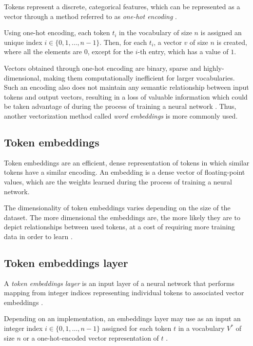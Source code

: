 Tokens represent a discrete, categorical features, which can be represented as a vector through a method referred to as \emph{one-hot encoding} \cite{hirst:neuralnetworkmethodsinnlp}.

Using one-hot encoding, each token $t_i$ in the vocabulary of size $n$ is assigned an unique index $i \in \{0, 1, \dots, n-1\}$. Then, for each $t_i$, a vector $v$ of size $n$ is created, where all the elements are $0$, except for the $i$-th entry, which has a value of $1$.

Vectors obtained through one-hot encoding are binary, sparse and highly-dimensional, making them computationally inefficient for larger vocabularies. Such an encoding also does not maintain any semantic relationship between input tokens and output vectors, resulting in a loss of valuable information which could be taken advantage of during the process of training a neural network \cite{tds:embeddings}. Thus, another vectorization method called \emph{word embeddings} is more commonly used.

\subsection{Token embeddings}
\label{embeddings}

Token embeddings are an efficient, dense representation of tokens in which similar tokens have a similar encoding. An embedding is a dense vector of floating-point values, which are the weights learned during the process of training a neural network.

The dimensionality of token embeddings varies depending on the size of the dataset. The more dimensional the embeddings are, the more likely they are to depict relationships between used tokens, at a cost of requiring more training data in order to learn \cite{tf:embeddings}. 


\subsection{Token embeddings layer}

A \emph{token embeddings layer} is an input layer of a neural network that performs mapping from integer indices representing individual tokens to associated vector embeddings \cite{tf:embeddings,ulmfit}.

Depending on an implementation, an embeddings layer may use as an input an integer index $i \in \{0, 1, \dots, n-1\}$ assigned for each token $t$ in a vocabulary $V^*$ of size $n$ \cite{tf:embeddings} or a one-hot-encoded vector representation of $t$ \cite{ulmfit:berlin}.

